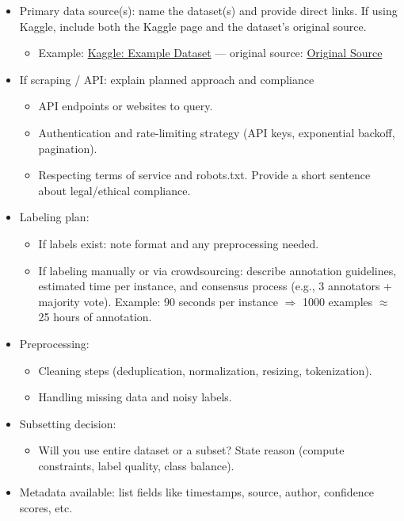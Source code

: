 \documentclass[12pt]{article}
\begin{document}
\begin{itemize}
  \item Primary data source(s): name the dataset(s) and provide direct links. If using Kaggle, include both the Kaggle page and the dataset's original source.
    \begin{itemize}
      \item Example: \href{https://www.kaggle.com/example}{Kaggle: Example Dataset} — original source: \href{https://original-source.example}{Original Source}
    \end{itemize}
  \item If scraping / API: explain planned approach and compliance
    \begin{itemize}
      \item API endpoints or websites to query.
      \item Authentication and rate-limiting strategy (API keys, exponential backoff, pagination).
      \item Respecting terms of service and robots.txt. Provide a short sentence about legal/ethical compliance.
    \end{itemize}
  \item Labeling plan:
    \begin{itemize}
      \item If labels exist: note format and any preprocessing needed.
      \item If labeling manually or via crowdsourcing: describe annotation guidelines, estimated time per instance, and consensus process (e.g., 3 annotators + majority vote). Example: 90 seconds per instance $\Rightarrow$ 1000 examples $\approx$ 25 hours of annotation.
    \end{itemize}
  \item Preprocessing:
    \begin{itemize}
      \item Cleaning steps (deduplication, normalization, resizing, tokenization).
      \item Handling missing data and noisy labels.
    \end{itemize}
  \item Subsetting decision:
    \begin{itemize}
      \item Will you use entire dataset or a subset? State reason (compute constraints, label quality, class balance).
    \end{itemize}
  \item Metadata available: list fields like timestamps, source, author, confidence scores, etc.
\end{itemize}
\end{document}
